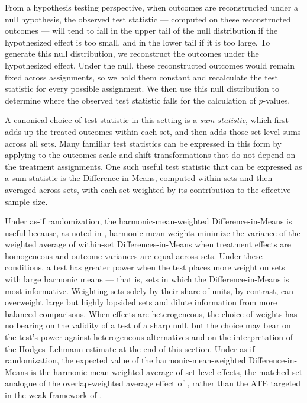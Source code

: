 \documentclass[twoside,11pt]{article}
\begin{document}
From a hypothesis testing perspective, when outcomes are reconstructed
under a null hypothesis, the observed test statistic --- computed on
these reconstructed outcomes --- will tend to fall in the upper tail of
the null distribution if the hypothesized effect is too small, and in
the lower tail if it is too large. To generate this null distribution,
we reconstruct the outcomes under the hypothesized effect. Under the
null, these reconstructed outcomes would remain fixed across
assignments, so we hold them constant and recalculate the test statistic
for every possible assignment. We then use this null distribution to
determine where the observed test statistic falls for the calculation of
\(p\)-values.

A canonical choice of test statistic in this setting is a \emph{sum
statistic}, which first adds up the treated outcomes within each set,
and then adds those set-level sums across all sets. Many familiar test
statistics can be expressed in this form by applying to the outcomes
scale and shift transformations that do not depend on the treatment
assignments. One such useful test statistic that can be expressed as a
sum statistic is the Difference-in-Means, computed within sets and then
averaged across sets, with each set weighted by its contribution to
the effective sample size.

Under as-if randomization, the harmonic-mean-weighted
Difference-in-Means is useful because, as noted in
,
harmonic-mean weights minimize the variance of the weighted average of
within-set Differences-in-Means when treatment effects are homogeneous
and outcome variances are equal across sets. Under these conditions, a
test has greater power
when the test places more weight on sets with large harmonic means --- that
is, sets in which the Difference-in-Means is most informative. Weighting
sets solely by their share of units, by contrast, can overweight large
but highly lopsided sets and dilute information from more balanced
comparisons. When effects are heterogeneous, the choice of weights has no
bearing on the validity of a test of a sharp null, but the choice may
bear on the test's power against heterogeneous alternatives and on the
interpretation of the Hodges--Lehmann estimate at the end of this
section. Under as-if randomization, the expected value of the
harmonic-mean-weighted Difference-in-Means is the
harmonic-mean-weighted average of set-level effects, the matched-set
analogue of the overlap-weighted average effect of \citet{lietal2018},
rather than the ATE targeted in the weak framework of
.
\end{document}
